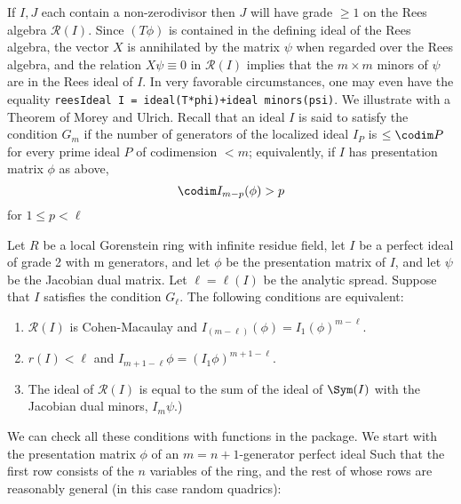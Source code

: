 \documentclass[twoside,12pt, leqno]{amsart}
\def\RR{{\mathcal R}}
\begin{document}
\begin{normalsize}
     If $I,J$ each contain a non-zerodivisor then
     $J$ will have grade $\geq 1$ on the Rees algebra $\RR(I)$. Since $(T\phi)$ is contained in the
     defining ideal of the Rees algebra, the vector $X$ is annihilated by the matrix
     $\psi$ when regarded over the Rees algebra, and the relation
     $X\psi \equiv 0$ in $\RR(I)$ implies that the $m\times m$ minors of $\psi$ are
     in the Rees ideal of $I$. In very favorable circumstances,
     one may even have the equality 
     {\tt reesIdeal I = ideal(T*phi)+ideal minors(psi)}. We illustrate with a Theorem of
     Morey and Ulrich. Recall that an ideal $I$ is said to satisfy the condition
     $G_{m}$ if the number of generators of the localized ideal $I_{P}$ is $\leq \codim P$
     for every prime ideal $P$ of codimension $<m$; equivalently, if $I$ has  presentation
      matrix $\phi$ as above, 
     $$
     \codim I_{m-p}(\phi)>p
     $$
     for $1\leq p < \ell$
     
     
\begin{theorem}[\cite{MU}]
    Let $R$ be a local Gorenstein ring with infinite residue field, let $I$ be a perfect ideal
     of grade 2 with m generators, and let $\phi$ be the presentation matrix of $I$,
     and let $\psi$ be the Jacobian dual matrix. Let
     $\ell = \ell(I)$ be the analytic spread. Suppose that
     $I$ satisfies the condition $G_{\ell}$. The following conditions are equivalent:
 
\begin{enumerate}
     \item $\RR(I)$ is Cohen-Macaulay and $I_(m-\ell)(\phi) = I_1(\phi)^{m-\ell}$.
     \item $r(I) < \ell$ and $I_{m+1-\ell}\phi = (I_1\phi)^{m+1-\ell}$.
     \item The ideal of $\RR(I)$ is equal to the sum of the ideal
     of $\Sym(I)$ with the Jacobian dual minors, $I_{m}\psi$.)
\end{enumerate}
    
\end{theorem}

We can check all these conditions with functions in the package.      
     We start with the presentation matrix $\phi$ of an $m = n+1$-generator perfect ideal
     Such that the first row consists of the $n$
     variables of the ring, and the rest of whose rows are reasonably general (in this
     case random quadrics):


\end{normalsize}
\end{document}
